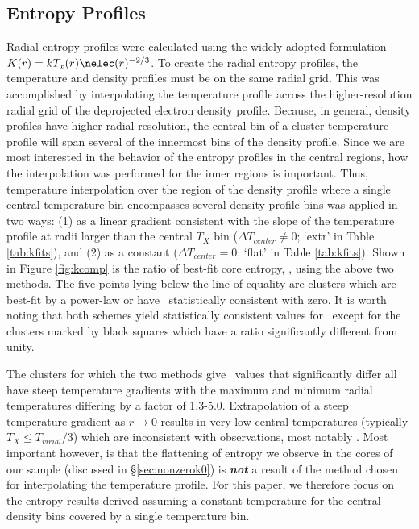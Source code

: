 \documentclass{emulateapj}
\begin{document}
\subsection{Entropy Profiles}
\label{sec:kpr}

Radial entropy profiles were calculated using the widely adopted
formulation $K(r) = kT_x(r)\nelec(r)^{-2/3}$. To create the radial
entropy profiles, the temperature and density profiles must be on the
same radial grid. This was accomplished by interpolating the
temperature profile across the higher-resolution radial grid of the
deprojected electron density profile. Because, in general, density
profiles have higher radial resolution, the central bin of a cluster
temperature profile will span several of the innermost bins of the
density profile. Since we are most interested in the behavior of the
entropy profiles in the central regions, how the interpolation was
performed for the inner regions is important. Thus, temperature
interpolation over the region of the density profile where a single
central temperature bin encompasses several density profile bins was
applied in two ways: (1) as a linear gradient consistent with the
slope of the temperature profile at radii larger than the central
$T_X$ bin ($\Delta T_{center} \ne 0$; `extr' in Table
\ref{tab:kfits}), and (2) as a constant ($\Delta T_{center}=0$; `flat'
in Table \ref{tab:kfits}). Shown in Figure \ref{fig:kcomp} is the
ratio of best-fit core entropy, \kna, using the above two methods. The
five points lying below the line of equality are clusters which are
best-fit by a power-law or have \kna\ statistically consistent with
zero. It is worth noting that both schemes yield statistically
consistent values for \kna\ except for the clusters marked by black
squares which have a ratio significantly different from unity.

The clusters for which the two methods give \kna\ values that
significantly differ all have steep temperature gradients with the
maximum and minimum radial temperatures differing by a factor of
1.3-5.0. Extrapolation of a steep temperature gradient as $r
\rightarrow 0$ results in very low central temperatures (typically
$T_X \leq T_{virial}/3$) which are inconsistent with observations,
most notably \citet{peterson03}. Most important however, is that the
flattening of entropy we observe in the cores of our sample (discussed
in \S\ref{sec:nonzerok0}) is {\bfseries\em{not}} a result of the
method chosen for interpolating the temperature profile. For this
paper, we therefore focus on the entropy results derived assuming a
constant temperature for the central density bins covered by a single
temperature bin.
\end{document}
